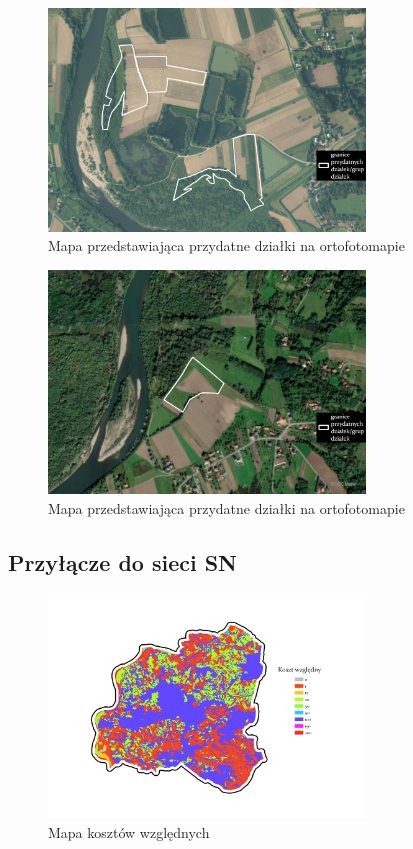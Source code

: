 \documentclass{article}
\begin{document}
\begin{figure}[H]
    \centering
    \includegraphics[width=0.75\textwidth]{img/plesna-dzialki-przydatne-ortofoto.jpg}
    \caption{Mapa przedstawiająca przydatne działki na ortofotomapie}
\end{figure}

\begin{figure}[H]
    \centering
    \includegraphics[width=0.75\textwidth]{img/plesna-dzialki-przydatne-ortofoto-2.jpg}
    \caption{Mapa przedstawiająca przydatne działki na ortofotomapie}
\end{figure}

\subsection{Przyłącze do sieci SN}
\begin{figure}[H]
    \centering
    \includegraphics[width=0.75\textwidth]{img/plesna-cost-raster.jpg}
    \caption{Mapa kosztów względnych}
\end{figure}
\end{document}
